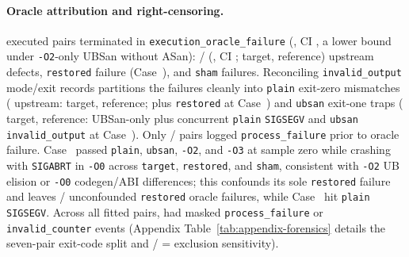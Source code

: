 \documentclass[11pt]{article}
\newcommand{\CaseRef}[1]{Case~#1}
\begin{document}
\paragraph{Oracle attribution and right-censoring.}
\BenchOracleFailN{} executed pairs terminated in \texttt{execution\_\allowbreak oracle\_\allowbreak failure} (\BenchOracleFailPct{}, CI \BenchOracleFailCI{}, a lower bound under \texttt{-O2}-only UBSan without ASan): \BenchOracleUpstreamN{}/\BenchPOneCount{} (\BenchOracleUpstreamPct{}, CI \BenchOracleUpstreamCI{}; \BenchOracleUpstreamTgtN{} target, \BenchOracleUpstreamRefN{} reference) upstream defects, \BenchOracleRestoredN{} \texttt{restored} failure (\CaseRef{\BenchPosTwoSeven{}}), and \BenchOracleShamN{} \texttt{sham} failures.
Reconciling \texttt{invalid\_output} mode/exit records partitions the \BenchOracleFailN{} failures cleanly into \BenchOraclePlainN{} \texttt{plain} exit-zero mismatches (\BenchOraclePlainUpstreamN{} upstream: \BenchOraclePlainTgtN{} target, \BenchOraclePlainRefN{} reference; plus \BenchOracleRestoredN{} \texttt{restored} at \CaseRef{\BenchPosTwoSeven{}}) and \BenchOracleUBAllN{} \texttt{ubsan} exit-one traps (\BenchOracleUBTgtN{} target, \BenchOracleUBRefN{} reference: \BenchOracleUBSanOnlyN{} UBSan-only plus \BenchOraclePlainSegvUBN{} concurrent \texttt{plain} \texttt{SIGSEGV} and \texttt{ubsan} \texttt{invalid\_output} at \CaseRef{\BenchPosTwoNine{}}).
Only \BenchOracleMultiEvtN{}/\BenchOracleFailN{} pairs logged \texttt{process\_failure} prior to oracle failure. \CaseRef{\BenchPosTwoSeven{}} passed \texttt{plain}, \texttt{ubsan}, \texttt{-O2}, and \texttt{-O3} at sample zero while crashing with \texttt{SIGABRT} in \texttt{-O0} across \texttt{target}, \texttt{restored}, and \texttt{sham}, consistent with \texttt{-O2} UB elision or \texttt{-O0} codegen/ABI differences; this confounds its sole \texttt{restored} failure and leaves \BenchUnconfRestoredOracleN{}/\BenchPOneCount{} unconfounded \texttt{restored} oracle failures, while \CaseRef{\BenchPosTwoNine{}} hit \texttt{plain} \texttt{SIGSEGV}. Across all \BenchFittedClusters{} fitted pairs, \BenchFittedMaskedFailN{} had masked \texttt{process\_failure} or \texttt{invalid\_counter} events (Appendix Table~\ref{tab:appendix-forensics} details the seven-pair exit-code split and \BenchOracleCoordN{}/\BenchOracleFailN{} = \BenchOracleCoordPct{} exclusion sensitivity).
\end{document}
